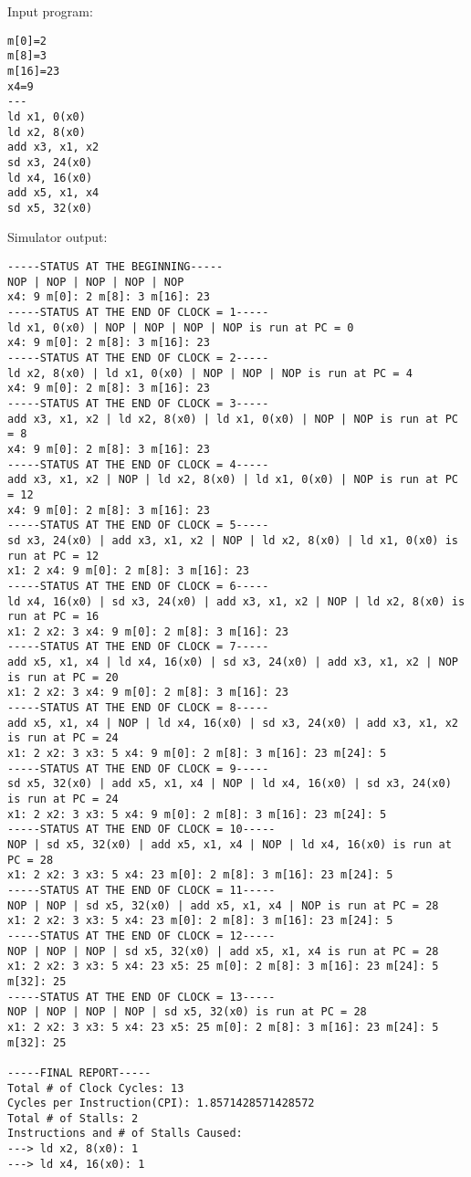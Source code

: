 \noindent Input program:
\vspace{0.5 cm}
\begin{lstlisting}
m[0]=2
m[8]=3
m[16]=23
x4=9
---
ld x1, 0(x0)
ld x2, 8(x0)
add x3, x1, x2
sd x3, 24(x0)
ld x4, 16(x0)
add x5, x1, x4
sd x5, 32(x0)
\end{lstlisting}
\vspace{0.5 cm}
Simulator output:
\vspace{0.5 cm}
\begin{lstlisting}
-----STATUS AT THE BEGINNING-----
NOP | NOP | NOP | NOP | NOP
x4: 9 m[0]: 2 m[8]: 3 m[16]: 23 
-----STATUS AT THE END OF CLOCK = 1-----
ld x1, 0(x0) | NOP | NOP | NOP | NOP is run at PC = 0
x4: 9 m[0]: 2 m[8]: 3 m[16]: 23 
-----STATUS AT THE END OF CLOCK = 2-----
ld x2, 8(x0) | ld x1, 0(x0) | NOP | NOP | NOP is run at PC = 4
x4: 9 m[0]: 2 m[8]: 3 m[16]: 23 
-----STATUS AT THE END OF CLOCK = 3-----
add x3, x1, x2 | ld x2, 8(x0) | ld x1, 0(x0) | NOP | NOP is run at PC = 8
x4: 9 m[0]: 2 m[8]: 3 m[16]: 23 
-----STATUS AT THE END OF CLOCK = 4-----
add x3, x1, x2 | NOP | ld x2, 8(x0) | ld x1, 0(x0) | NOP is run at PC = 12
x4: 9 m[0]: 2 m[8]: 3 m[16]: 23 
-----STATUS AT THE END OF CLOCK = 5-----
sd x3, 24(x0) | add x3, x1, x2 | NOP | ld x2, 8(x0) | ld x1, 0(x0) is run at PC = 12
x1: 2 x4: 9 m[0]: 2 m[8]: 3 m[16]: 23 
-----STATUS AT THE END OF CLOCK = 6-----
ld x4, 16(x0) | sd x3, 24(x0) | add x3, x1, x2 | NOP | ld x2, 8(x0) is run at PC = 16
x1: 2 x2: 3 x4: 9 m[0]: 2 m[8]: 3 m[16]: 23 
-----STATUS AT THE END OF CLOCK = 7-----
add x5, x1, x4 | ld x4, 16(x0) | sd x3, 24(x0) | add x3, x1, x2 | NOP is run at PC = 20
x1: 2 x2: 3 x4: 9 m[0]: 2 m[8]: 3 m[16]: 23 
-----STATUS AT THE END OF CLOCK = 8-----
add x5, x1, x4 | NOP | ld x4, 16(x0) | sd x3, 24(x0) | add x3, x1, x2 is run at PC = 24
x1: 2 x2: 3 x3: 5 x4: 9 m[0]: 2 m[8]: 3 m[16]: 23 m[24]: 5 
-----STATUS AT THE END OF CLOCK = 9-----
sd x5, 32(x0) | add x5, x1, x4 | NOP | ld x4, 16(x0) | sd x3, 24(x0) is run at PC = 24
x1: 2 x2: 3 x3: 5 x4: 9 m[0]: 2 m[8]: 3 m[16]: 23 m[24]: 5 
-----STATUS AT THE END OF CLOCK = 10-----
NOP | sd x5, 32(x0) | add x5, x1, x4 | NOP | ld x4, 16(x0) is run at PC = 28
x1: 2 x2: 3 x3: 5 x4: 23 m[0]: 2 m[8]: 3 m[16]: 23 m[24]: 5 
-----STATUS AT THE END OF CLOCK = 11-----
NOP | NOP | sd x5, 32(x0) | add x5, x1, x4 | NOP is run at PC = 28
x1: 2 x2: 3 x3: 5 x4: 23 m[0]: 2 m[8]: 3 m[16]: 23 m[24]: 5 
-----STATUS AT THE END OF CLOCK = 12-----
NOP | NOP | NOP | sd x5, 32(x0) | add x5, x1, x4 is run at PC = 28
x1: 2 x2: 3 x3: 5 x4: 23 x5: 25 m[0]: 2 m[8]: 3 m[16]: 23 m[24]: 5 m[32]: 25 
-----STATUS AT THE END OF CLOCK = 13-----
NOP | NOP | NOP | NOP | sd x5, 32(x0) is run at PC = 28
x1: 2 x2: 3 x3: 5 x4: 23 x5: 25 m[0]: 2 m[8]: 3 m[16]: 23 m[24]: 5 m[32]: 25 

-----FINAL REPORT-----
Total # of Clock Cycles: 13
Cycles per Instruction(CPI): 1.8571428571428572
Total # of Stalls: 2
Instructions and # of Stalls Caused: 
---> ld x2, 8(x0): 1
---> ld x4, 16(x0): 1
\end{lstlisting}

